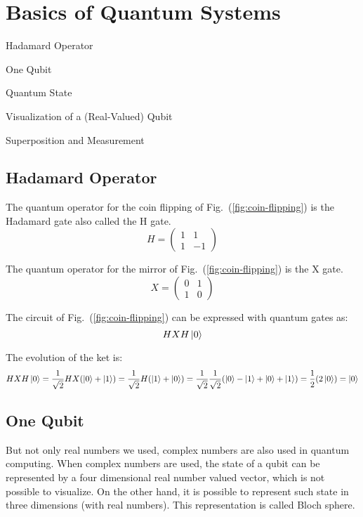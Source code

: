 \section{Basics of Quantum Systems}
\begin{introduction}
	\item Hadamard Operator
	\item One Qubit
	\item Quantum State
	\item Visualization of a (Real-Valued) Qubit
	\item Superposition and Measurement
\end{introduction}

\subsection{Hadamard Operator}
The quantum operator for the coin flipping of Fig.~(\ref{fig:coin-flipping}) is the Hadamard gate also called the H gate.
\begin{equation*}
	H=\begin{pmatrix}
			1 & 1 \\ 1 & -1
	\end{pmatrix}
\end{equation*}

The quantum operator for the mirror of Fig.~(\ref{fig:coin-flipping}) is the X gate.
\begin{equation*}
	X=\begin{pmatrix}
		  0 & 1 \\ 1 & 0
	\end{pmatrix}
\end{equation*}

The circuit of Fig.~(\ref{fig:coin-flipping}) can be expressed with quantum gates as:
\begin{equation*}
	HXH\ket{0}
\end{equation*}

The evolution of the ket is:
\begin{equation*}
	HXH\ket{0}=\frac{1}{\sqrt {2}}HX(\ket{0}+\ket{1})=\frac{1}{\sqrt {2}}H(\ket{1}+\ket{0})=\frac{1}{\sqrt {2}}\frac{1}{\sqrt {2}}(\ket{0}-\ket{1}+\ket{0}+\ket{1})=\frac{1}{2}(2\ket{0})=\ket{0}
\end{equation*}

\subsection{One Qubit}
But not only real numbers we used, complex numbers are also used in quantum computing.
When complex numbers are used, the state of a qubit can be represented by a four dimensional real number valued vector, which is not possible to visualize.
On the other hand, it is possible to represent such state in three dimensions (with real numbers).
This representation is called Bloch sphere.

